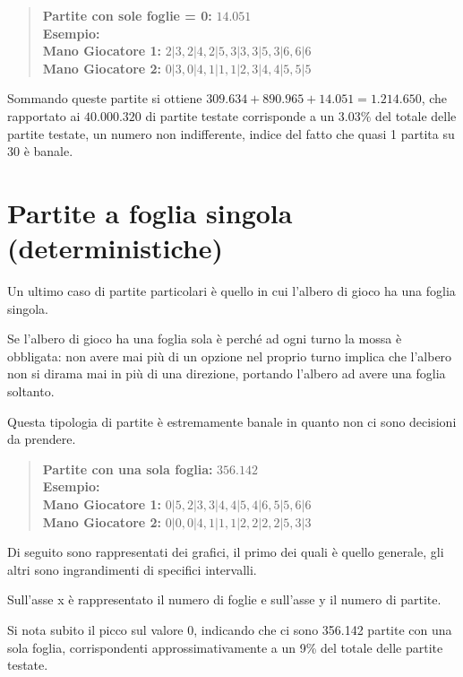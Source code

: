 \documentclass[a4paper,12pt]{report}
\begin{document}
\begin{quote}
    \textbf{Partite con sole foglie = 0:} \(14.051 \)\\
    \textbf{Esempio:} \(\)\\
    \textbf{Mano Giocatore 1:} \(2|3, 2|4, 2|5, 3|3, 3|5, 3|6, 6|6\)\\
    \textbf{Mano Giocatore 2:} \(0|3, 0|4, 1|1, 1|2, 3|4, 4|5, 5|5\)
\end{quote}

Sommando queste partite si ottiene \(309.634 + 890.965 + 14.051 = 1.214.650 \), che rapportato ai \( 40.000.320 \) di partite testate corrisponde a un \( 3.03 \% \) del totale delle partite testate, un numero non indifferente, indice del fatto che quasi 1 partita su 30 è banale.


\section{Partite a foglia singola (deterministiche)}

Un ultimo caso di partite particolari è quello in cui l'albero di gioco ha una foglia singola.

Se l'albero di gioco ha una foglia sola è perché ad ogni turno la mossa è obbligata: non avere mai più di un opzione nel proprio turno implica che l'albero non si dirama mai in più di una direzione, portando l'albero ad avere una foglia soltanto.

Questa tipologia di partite è estremamente banale in quanto non ci sono decisioni da prendere.

\begin{quote}
    \textbf{Partite con una sola foglia:} \(356.142\)\\
    \textbf{Esempio:} \(\)\\
    \textbf{Mano Giocatore 1:} \(0|5, 2|3, 3|4, 4|5, 4|6, 5|5, 6|6\)\\
    \textbf{Mano Giocatore 2:} \(0|0, 0|4, 1|1, 1|2, 2|2, 2|5, 3|3\)
\end{quote}

Di seguito sono rappresentati dei grafici, il primo dei quali è quello generale, gli altri sono ingrandimenti di specifici intervalli.

Sull'asse x è rappresentato il numero di foglie e sull'asse y il numero di partite.

Si nota subito il picco sul valore 0, indicando che ci sono 356.142 partite con una sola foglia, corrispondenti approssimativamente a un 9\% del totale delle partite testate.
\end{document}
